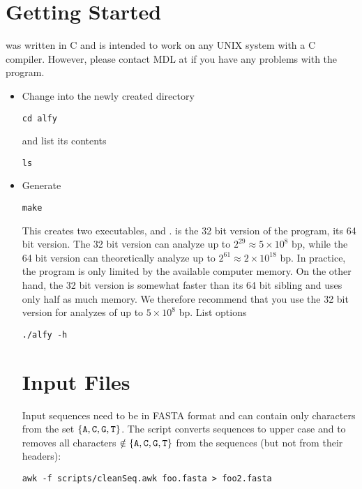 \documentclass{article}
\begin{document}
\section{Getting Started}
 was written in C and is
intended to work on any UNIX system with a C compiler. However, please contact
MDL at  if you have any problems with the
program.
\begin{itemize}
  \I Download 
\begin{verbatim}
git clone https://github.com/evolbioinf/alfy
\end{verbatim}
\item Change into the newly created directory
\begin{verbatim}
cd alfy  
\end{verbatim}
and list its contents
\begin{verbatim}
ls
\end{verbatim}
\item Generate 
\begin{verbatim}
make
\end{verbatim}
This creates two executables,  and .  is
the 32 bit version of the program,  its 64 bit version. The 32 bit version can
analyze up to $2^{29}\approx 5\times 10^8$ bp, while the 64 bit version
can theoretically analyze up to $2^{61}\approx 2\times 10^{18}$ bp. In
practice, the program is only limited by the available computer
memory. On
the other hand, the 32 bit version is somewhat faster than its 64 bit
sibling and uses only half as much memory. We therefore recommend that
you use the 32 bit version for analyzes of up to $5\times 10^8$ bp.
\I List options
\begin{verbatim}
./alfy -h
\end{verbatim}
\ei

\section{Input Files}
Input sequences need to be in FASTA format and can contain only characters
from the set $\{\texttt{A}, \texttt{C}, \texttt{G}, \texttt{T}\}$. The script
 converts sequences to upper case and
to removes all characters $\notin \{\texttt{A}, \texttt{C}, \texttt{G}, \texttt{T}\}$
from the sequences (but not from their headers):
\begin{verbatim}
awk -f scripts/cleanSeq.awk foo.fasta > foo2.fasta
\end{verbatim}


\end{itemize}
\end{document}

